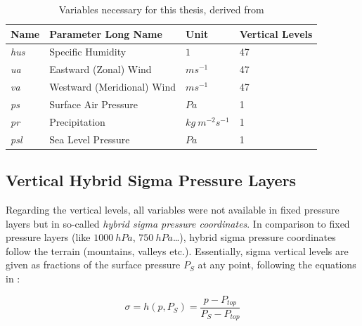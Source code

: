 \begin{table}[bht]
\centering
\caption{Variables necessary for this thesis, derived from \cite{olonscheck_new_2023}}
\begin{tabular}{l|l|l|l}
  \label{tab:thesisVariables}
\textbf{Name} & \textbf{Parameter Long Name} & \textbf{Unit}                & \multicolumn{1}{l}{\textbf{Vertical Levels}}  \\ 
\hline
\textit{hus}              & Specific Humidity            & $1$                        & 47                                            \\
\textit{ua}               & Eastward (Zonal) Wind        & $ms^{-1}$              & 47                                            \\
\textit{va}               & Westward (Meridional) Wind   & $ms^{-1}$              & 47                                            \\
\textit{ps}               & Surface Air Pressure         & $Pa$                           & 1                                             \\
\textit{pr}               & Precipitation                & $kg~m^{-2} s^{-1}$ & 1    \\                                        
\textit{psl}               & Sea Level Pressure                & $Pa$ & 1            \\                                
\end{tabular}
\end{table}


\subsection{Vertical Hybrid Sigma Pressure Layers}
\label{sec:hybridsigma}

Regarding the vertical levels, all variables were not available in fixed pressure layers but in so-called \textit{hybrid sigma pressure coordinates}. 
In comparison to fixed pressure layers (like $1000 ~hPa$, $750 ~hPa$\dots), hybrid sigma pressure coordinates follow the terrain (mountains, valleys etc.). 
Essentially, sigma vertical levels are given as fractions of the surface pressure $P_S$ at any point, following the equations in \cite{eckermann_hybrid_2009}: 

\begin{equation}
\label{eq:sigma-definition}
\sigma = h(p,P_S) = \frac{p - P_{top}}{P_S - P_{top}}
\end{equation}

